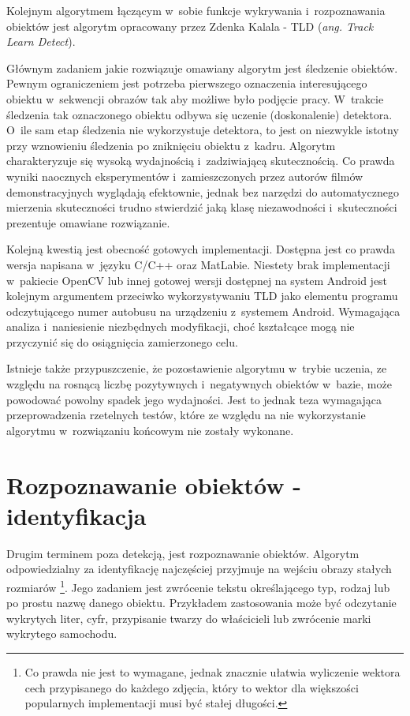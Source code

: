 Kolejnym algorytmem łączącym w~sobie funkcje wykrywania
i~rozpoznawania obiektów jest algorytm opracowany przez
Zdenka Kalala \cite{DBLP:journals/pami/KalalMM12} - TLD (\textit{ang.
Track Learn Detect}).

Głównym zadaniem jakie rozwiązuje omawiany algorytm jest śledzenie obiektów.
Pewnym ograniczeniem jest potrzeba pierwszego oznaczenia interesującego
obiektu w~sekwencji obrazów tak aby możliwe było podjęcie pracy.
W~trakcie śledzenia tak oznaczonego obiektu odbywa się uczenie (doskonalenie)
detektora. O~ile sam etap śledzenia nie wykorzystuje detektora, to jest on
niezwykle istotny przy wznowieniu śledzenia po zniknięciu obiektu z~kadru.
Algorytm charakteryzuje się wysoką wydajnością i~zadziwiającą skutecznością.
Co prawda wyniki naocznych eksperymentów i~zamieszczonych przez autorów filmów
demonstracyjnych wyglądają efektownie, jednak bez narzędzi do automatycznego
mierzenia skuteczności trudno stwierdzić jaką klasę niezawodności 
i~skuteczności prezentuje omawiane rozwiązanie.

Kolejną kwestią jest obecność gotowych implementacji.
Dostępna jest co prawda wersja napisana w~języku C/C++ oraz MatLabie.
Niestety brak implementacji w~pakiecie OpenCV lub
innej gotowej wersji dostępnej na system Android jest kolejnym
argumentem przeciwko wykorzystywaniu TLD jako elementu
programu odczytującego numer autobusu na urządzeniu z~systemem Android.
Wymagająca analiza i~naniesienie
niezbędnych modyfikacji,
choć kształcące mogą nie przyczynić się do osiągnięcia zamierzonego celu.

Istnieje także przypuszczenie, że pozostawienie algorytmu w~trybie uczenia,
ze względu na rosnącą liczbę pozytywnych i~negatywnych obiektów w~bazie,
może powodować powolny spadek jego wydajności. Jest to jednak teza 
wymagająca przeprowadzenia rzetelnych testów, które ze względu
na nie wykorzystanie algorytmu w~rozwiązaniu końcowym nie zostały
wykonane.

\section{Rozpoznawanie obiektów - identyfikacja}

Drugim terminem poza detekcją, jest rozpoznawanie obiektów. Algorytm
odpowiedzialny za 
identyfikację najczęściej przyjmuje na wejściu obrazy stałych rozmiarów
\footnote{Co prawda nie jest to wymagane, jednak znacznie ułatwia 
wyliczenie wektora cech przypisanego do każdego zdjęcia, który to 
wektor dla większości popularnych implementacji musi być stałej 
długości.}.
Jego zadaniem jest zwrócenie
tekstu określającego typ, rodzaj lub po prostu nazwę danego obiektu.
Przykładem zastosowania może być odczytanie wykrytych liter,
cyfr, przypisanie twarzy do właścicieli lub zwrócenie marki wykrytego
samochodu.

